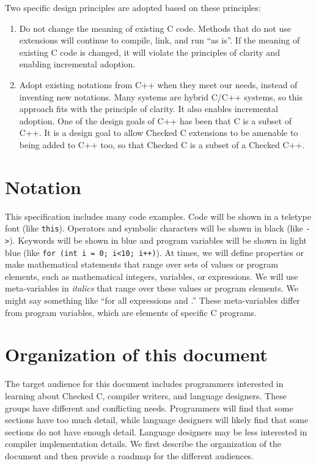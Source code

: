 Two specific design principles are adopted based on these principles:

\begin{enumerate}
\item
  Do not change the meaning of existing C code. Methods that do not use
  extensions will continue to compile, link, and run ``as is''. If the
  meaning of existing C code is changed, it will violate the principles
  of clarity and enabling incremental adoption.
\item
  Adopt existing notations from C++ when they meet our needs, instead of
  inventing new notations. Many systems are hybrid C/C++ systems, so
  this approach fits with the principle of clarity. It also enables
  incremental adoption. One of the design goals of C++ has been that C
  is a subset of C++.  It is a design goal to allow Checked C extensions
  to be amenable to being added to C++ too, so that Checked C is a subset
  of a Checked C++.
\end{enumerate}

\section{Notation}
This specification includes many code examples.   Code will be shown in a teletype font (like \texttt{\small this}).
Operators and symbolic characters will be shown in black (like \lstinline|->|).    Keywords will be shown in blue and program
variables will be shown in light blue (like \lstinline|for (int i = 0; i<10; i++)|).   At times, we will
define properties or make mathematical statements that range over sets of values or program
elements, such as mathematical integers, variables, or expressions.   We will use meta-variables in {\it italics} that
range over these values or program elements.  We might say something like
``for all expressions  and .''   These meta-variables
 differ from program variables, which are elements of specific C programs.

\section{Organization of this document}

The target audience for this document includes programmers interested in
learning about Checked C, compiler writers, and language designers.
These groups have different and conflicting needs.  Programmers will find that
some sections have too much detail, while language designers will likely
find that some sections do not have enough detail.  Language designers
may be less interested in compiler implementation details.
We first describe the organization of the document and then provide
a roadmap for the different audiences.

